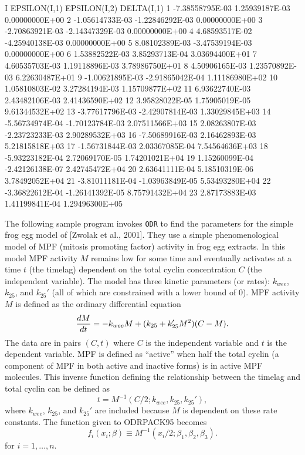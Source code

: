 {{\phantom{blank line}
         I    EPSILON(I,1)    EPSILON(I,2)      DELTA(I,1)
\phantom{blank line}
         1 -7.38558795E-03  1.25939187E-03  0.00000000E+00
         2 -1.05614733E-03 -1.22846292E-03  0.00000000E+00
         3 -2.70863921E-03 -2.14347329E-03  0.00000000E+00
         4  4.68593517E-02 -4.25940138E-03  0.00000000E+00
         5  8.08102389E-03 -3.47539194E-03  0.00000000E+00
         6  1.53882522E-03  3.85293713E-04  3.03694400E+01
         7  4.60535703E-03  1.19118896E-03  3.78986750E+01
         8  4.50906165E-03  1.23570892E-03  6.22630487E+01
         9 -1.00621895E-03 -2.91865042E-04  1.11186980E+02
        10  1.05810803E-02  3.27284194E-03  1.15709877E+02
        11  6.93622740E-03  2.43482106E-03  2.41436590E+02
        12  3.95828022E-05  1.75905019E-05  9.61344532E+02
        13 -3.77617796E-03 -2.42907814E-03  1.33029845E+03
        14 -5.56734974E-04 -1.70123784E-03  2.07511566E+03
        15  2.08263807E-03 -2.23723233E-03  2.90289532E+03
        16 -7.50689916E-03  2.16462893E-03  5.21815818E+03
        17 -1.56731844E-03  2.03367085E-04  7.54564636E+03
        18 -5.93223182E-04  2.72069170E-05  1.74201021E+04
        19  1.15260099E-04 -2.42126138E-07  2.42745472E+04
        20  2.63641111E-04  5.18510319E-06  3.78492052E+04
        21 -3.81011181E-04 -1.03963849E-05  5.53493280E+04
        22 -3.36822612E-04 -1.26141392E-05  8.75791432E+04
        23  2.87173883E-03  1.41199841E-04  1.29496300E+05
}}
\vfil\eject

\bigskip{}
\medskip
\noindent The following sample program invokes {\tt ODR} to find the parameters
for the simple frog egg model of [Zwolak et al., 2001].  They use a simple
phenomenological model of MPF (mitosis promoting factor) activity in frog
egg extracts.  In this model MPF activity $M$ remains low for some time
and eventually activates at a time $t$ (the timelag) dependent on the
total cyclin concentration $C$ (the independent variable).  The model has
three kinetic parameters (or rates): $k_{wee}$, $k_{25}$, and $k_{25}'$
(all of which are constrained with a lower bound of 0).  MPF activity $M$
is defined as the ordinary differential equation
$$
{dM \over dt} = -k_{wee}M+(k_{25}+k_{25}'M^2)(C-M).
$$
The data are in pairs $(C,t)$ where $C$ is the independent variable and $t$ is 
the dependent variable.  MPF is defined as
``active'' when half the total cyclin (a component of MPF in both active and
inactive forms) is in active MPF molecules.  This inverse function defining the
relationship between the timelag and total cyclin can be defined as
$$
t = M^{-1}(C / 2; k_{wee}, k_{25}, k_{25}'),
$$
where $k_{wee}$, $k_{25}$, and $k_{25}'$ are included because $M$ is dependent
on these rate constants.
The function given to ODRPACK95 becomes
$$
f_i(x_i;\beta) \equiv M^{-1}(x_i/2; \beta_1, \beta_2, \beta_3).
$$
for $i=1,\ldots, n.$

